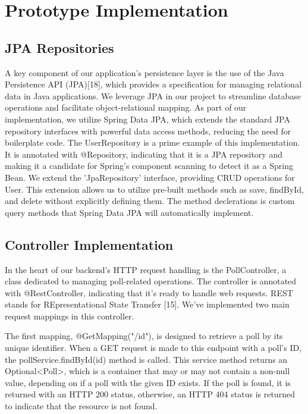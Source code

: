 \section{Prototype Implementation}
\label{sec:implementation}

\subsection{JPA Repositories}
A key component of our application's persistence layer is the use of the Java Persistence API (JPA)[18], which provides a specification for managing relational data in Java applications. We leverage JPA in our project to streamline database operations and facilitate object-relational mapping. As part of our implementation, we utilize Spring Data JPA, which extends the standard JPA repository interfaces with powerful data access methods, reducing the need for boilerplate code.
The UserRepository is a prime example of this implementation. It is annotated with @Repository, indicating that it is a JPA repository and making it a candidate for Spring's component scanning to detect it as a Spring Bean.
We extend the 'JpaRepository' interface, providing CRUD operations for User. This extension allows us to utilize pre-built methods such as save, findById, and delete without explicitly defining them.
The method declerations is custom query methods that Spring Data JPA will automatically implement.


\subsection{Controller Implementation}
In the heart of our backend's HTTP request handling is the PollController, a class dedicated to managing poll-related operations. The controller is annotated with @RestController, indicating that it's ready to handle web requests. REST stands for REpresentational State Transfer [15]. We've implemented two main request mappings in this controller.

The first mapping, @GetMapping("/{id}"), is designed to retrieve a poll by its unique identifier. When a GET request is made to this endpoint with a poll's ID, the pollService.findById(id) method is called. This service method returns an Optional<Poll>, which is a container that may or may not contain a non-null value, depending on if a poll with the given ID exists. If the poll is found, it is returned with an HTTP 200 status, otherwise, an HTTP 404 status is returned to indicate that the resource is not found.


